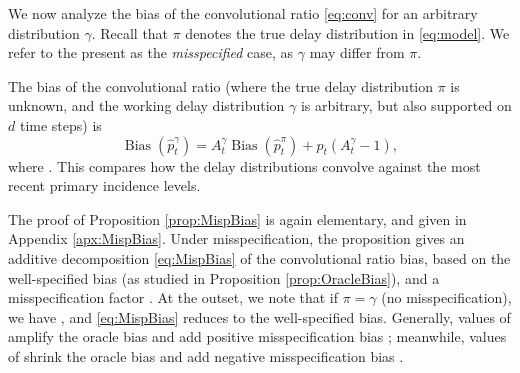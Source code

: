 \documentclass{article}
\renewcommand{\hat}{\widehat} %
\DeclareMathOperator{\bias}{Bias}
\begin{document}
We now analyze the bias of the convolutional ratio \eqref{eq:conv} for an
arbitrary distribution $\gamma$. Recall that $\pi$ denotes the true delay
distribution in \eqref{eq:model}. We refer to the present as the
\emph{misspecified} case, as $\gamma$ may differ from $\pi$.    

\begin{proposition}
\label{prop:MispBias}
The bias of the convolutional ratio \smash{$\hat{p}_t^\gamma$} (where the true 
delay distribution $\pi$ is unknown, and the working delay distribution $\gamma$
is arbitrary, but also supported on $d$ time steps) is
\begin{equation}
\label{eq:MispBias}
\bias(\hat{p}_t^\gamma) = A_t^\gamma \bias(\hat{p}_t^\pi) + p_t (A_t^\gamma-1),  
\end{equation}
where . This compares how the delay distributions convolve against  
the most recent primary incidence levels. 
\end{proposition}

The proof of Proposition \ref{prop:MispBias} is again elementary, and given in 
Appendix \ref{apx:MispBias}. Under misspecification, the proposition gives an
additive decomposition \eqref{eq:MispBias} of the convolutional ratio bias,
based on the well-specified bias \smash{$\bias(\hat{p}_t^\pi)$} (as studied in
Proposition \ref{prop:OracleBias}), and a misspecification factor
. At the outset, we note that if $\pi = \gamma$ (no  
misspecification), we have , and \eqref{eq:MispBias}
reduces to the well-specified bias. Generally, values of  amplify the oracle bias and add positive misspecification bias ; meanwhile, values of  shrink the
oracle bias and add negative misspecification bias . 
\end{document}
